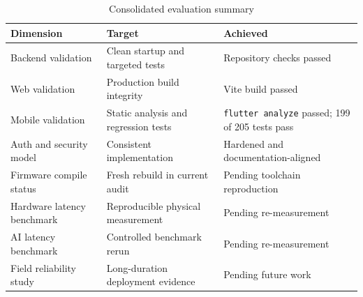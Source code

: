\begin{table}[ht]
\centering
\caption{Consolidated evaluation summary}
\label{tab:eval_summary}
\begin{tabular}{lll}
\toprule
\textbf{Dimension} & \textbf{Target} & \textbf{Achieved} \\
\midrule
Backend validation           & Clean startup and targeted tests & Repository checks passed \\
Web validation               & Production build integrity & Vite build passed \\
Mobile validation            & Static analysis and regression tests & \texttt{flutter analyze} passed; 199 of 205 tests pass \\
Auth and security model      & Consistent implementation & Hardened and documentation-aligned \\
Firmware compile status      & Fresh rebuild in current audit & Pending toolchain reproduction \\
Hardware latency benchmark   & Reproducible physical measurement & Pending re-measurement \\
AI latency benchmark         & Controlled benchmark rerun & Pending re-measurement \\
Field reliability study      & Long-duration deployment evidence & Pending future work \\
\bottomrule
\end{tabular}
\end{table}
